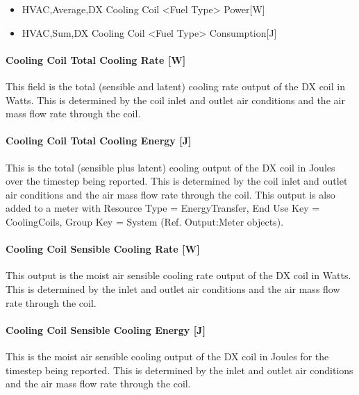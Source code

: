 \begin{itemize}
\item
  HVAC,Average,DX Cooling Coil \textless{}Fuel Type\textgreater{} Power{[}W{]}
\item
  HVAC,Sum,DX Cooling Coil \textless{}Fuel Type\textgreater{} Consumption{[}J{]}
\end{itemize}

\paragraph{Cooling Coil Total Cooling Rate {[}W{]}}\label{cooling-coil-total-cooling-rate-w-4}

This field is the total (sensible and latent) cooling rate output of the DX coil in Watts. This is determined by the coil inlet and outlet air conditions and the air mass flow rate through the coil.

\paragraph{Cooling Coil Total Cooling Energy {[}J{]}}\label{cooling-coil-total-cooling-energy-j-4}

This is the total (sensible plus latent) cooling output of the DX coil in Joules over the timestep being reported. This is determined by the coil inlet and outlet air conditions and the air mass flow rate through the coil. This output is also added to a meter with Resource Type = EnergyTransfer, End Use Key = CoolingCoils, Group Key = System (Ref. Output:Meter objects).

\paragraph{Cooling Coil Sensible Cooling Rate {[}W{]}}\label{cooling-coil-sensible-cooling-rate-w-4}

This output is the moist air sensible cooling rate output of the DX coil in Watts. This is determined by the inlet and outlet air conditions and the air mass flow rate through the coil.

\paragraph{Cooling Coil Sensible Cooling Energy {[}J{]}}\label{cooling-coil-sensible-cooling-energy-j-4}

This is the moist air sensible cooling output of the DX coil in Joules for the timestep being reported. This is determined by the inlet and outlet air conditions and the air mass flow rate through the coil.

